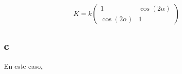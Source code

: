 \documentclass[a4paper,12pt]{article}
\begin{document}
\begin{equation}
  K = k\begin{pmatrix}
    1&\cos{(2\alpha)}\\\cos{(2\alpha)}&1
  \end{pmatrix}
\end{equation}



\subsection*{c}

En este caso, 
\end{document}
